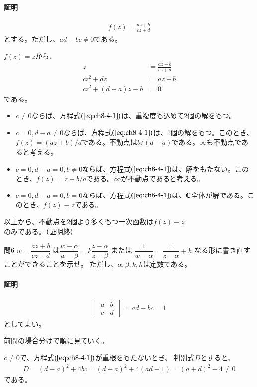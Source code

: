 \paragraph{証明}
\begin{align*}
    f(z)=\frac{az+b}{cz+d}
\end{align*}
とする。ただし、$ad-bc\neq0$である。

$f(z)=z$から、
\begin{align}
    z&=\frac{az+b}{cz+d}\nonumber\\
    cz^2+dz&=az+b\nonumber\\
    cz^2+(d-a)z-b&=0\label{eq:ch8-4-1}
\end{align}
である。
\begin{itemize}
    \item $c\neq0$ならば、方程式$(\ref{eq:ch8-4-1})$は、重複度も込めて2個の解をもつ。
    \item $c=0,d-a\neq0$ならば、方程式$(\ref{eq:ch8-4-1})$は、1個の解をもつ。このとき、$f(z)=(az+b)/d$である。不動点は$b/(d-a)$である。$\infty$も不動点であると考える。
    \item $c=0,d-a=0,b\neq0$ならば、方程式$(\ref{eq:ch8-4-1})$は、解をもたない。このとき、$f(z)=z+b/a$である。$\infty$が不動点であると考える。
    \item $c=0,d-a=0,b=0$ならば、方程式$(\ref{eq:ch8-4-1})$は、$\mathbb{C}$全体が解である。このとき、$f(z)\equiv z$である。
\end{itemize}
以上から、不動点を2個より多くもつ一次函数は$f(z)\equiv z$のみである。（証明終）

\newpage
\begin{mysimplebox}{問6}
    $w=\dfrac{az+b}{cz+d}$
    は$\dfrac{w-\alpha}{w-\beta}=k\dfrac{z-\alpha}{z-\beta}$
    または
    $\dfrac{1}{w-\alpha}=\dfrac{1}{z-\alpha}+h$
    なる形に書き直すことができることを示せ。
    ただし、$\alpha,\beta,k,h$は定数である。
\end{mysimplebox}
\paragraph{証明}
\begin{align*}
    \begin{vmatrix}
        a&b\\
        c&d
    \end{vmatrix}
    =ad-bc=1
\end{align*}
としてよい。

前問の場合分けで順に見ていく。

$c\neq0$で、方程式$(\ref{eq:ch8-4-1})$が重根をもたないとき、
判別式$D$とすると、
\begin{align*}
    D=(d-a)^2+4bc
    =(d-a)^2+4(ad-1)
    =(a+d)^2-4\neq0
\end{align*}
である。

